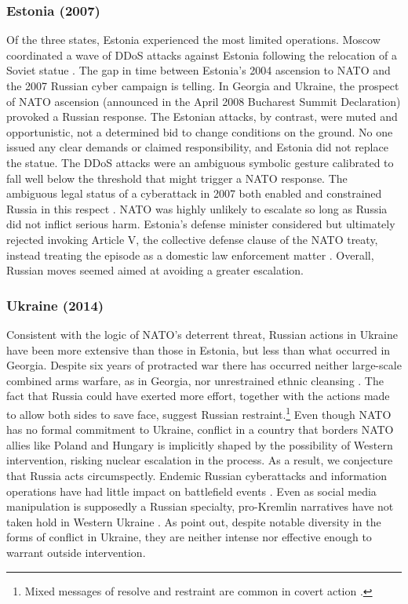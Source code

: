 \documentclass[bibtex, autowc]{apsr_submission}
\begin{document}
\subsubsection{Estonia (2007)}
Of the three states, Estonia experienced the most limited operations. Moscow coordinated a wave of DDoS attacks against Estonia following the relocation of a Soviet statue \citep{schmidt_estoniancyberattacks_2013}. The gap in time between Estonia’s 2004 ascension to NATO and the 2007 Russian cyber campaign is telling. In Georgia and Ukraine, the prospect of NATO ascension (announced in the April 2008 Bucharest Summit Declaration) provoked a Russian response. The Estonian attacks, by contrast, were muted and opportunistic, not a determined bid to change conditions on the ground. No one issued any clear demands or claimed responsibility, and Estonia did not replace the statue. The DDoS attacks were an ambiguous symbolic gesture calibrated to fall well below the threshold that might trigger a NATO response. The ambiguous legal status of a cyberattack in 2007 both enabled and constrained Russia in this respect \citep{joubert_fiveyearsestonia_2012}. NATO was highly unlikely to escalate so long as Russia did not inflict serious harm. Estonia’s defense minister considered but ultimately rejected invoking Article V, the collective defense clause of the NATO treaty, instead treating the episode as a domestic law enforcement matter \citep{traynor_russiaaccusedunleashing_2007}. Overall, Russian moves seemed aimed at avoiding a greater escalation.

\subsubsection{Ukraine (2014)}
Consistent with the logic of NATO's deterrent threat, Russian actions in Ukraine have been more extensive than those in Estonia, but less than what occurred in Georgia. Despite six years of protracted war there has occurred neither large-scale combined arms warfare, as in Georgia, nor unrestrained ethnic cleansing \citep{driscoll_socialmediarussian_2020}. The fact that Russia could have exerted more effort, together with the actions made to allow both sides to save face, suggest Russian restraint.\footnote{Mixed messages of resolve and restraint are common in covert action \citep{carson_secretwarscovert_2018}.} Even though NATO has no formal commitment to Ukraine, conflict in a country that borders NATO allies like Poland and Hungary is implicitly shaped by the possibility of Western intervention, risking nuclear escalation in the process. As a result, we conjecture that Russia acts circumspectly. Endemic Russian cyberattacks and information operations have had little impact on battlefield events \citep{kostyuk_invisibledigitalfront_2019}. Even as social media manipulation is supposedly a Russian specialty, pro-Kremlin narratives have not taken hold in Western Ukraine \citep{driscoll_socialmediarussian_2020}. As \citet{brantly_defendingborderlandukrainian_2017} point out, despite notable diversity in the forms of conflict in Ukraine, they are neither intense nor effective enough to warrant outside intervention. 
\end{document}
